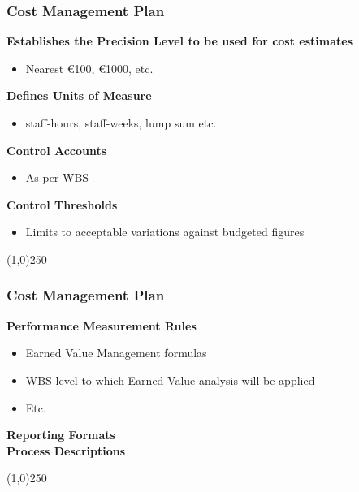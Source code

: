 \begin{frame}
\frametitle{Cost Management Plan}
\textbf{Establishes the Precision Level to be used for cost estimates}
\begin{itemize}
	\item Nearest \euro100, \euro1000, etc.
\end{itemize}
\textbf{Defines Units of Measure}
\begin{itemize}
	\item staff-hours, staff-weeks, lump sum etc.
\end{itemize}
\textbf{Control Accounts}
\begin{itemize}
	\item As per WBS
\end{itemize}
\textbf{Control Thresholds}
\begin{itemize}
	\item Limits to acceptable variations against budgeted figures
\end{itemize}
\end{frame}
\begin{center}\line(1,0){250}\end{center}






\begin{frame}
\frametitle{Cost Management Plan}
\textbf{Performance Measurement Rules}
\begin{itemize}
	\item Earned Value Management formulas
	\item WBS level to which Earned Value analysis will be applied
	\item Etc.
\end{itemize}
\textbf{Reporting Formats}\\
\textbf{Process Descriptions}
\end{frame}
\begin{center}\line(1,0){250}\end{center}






